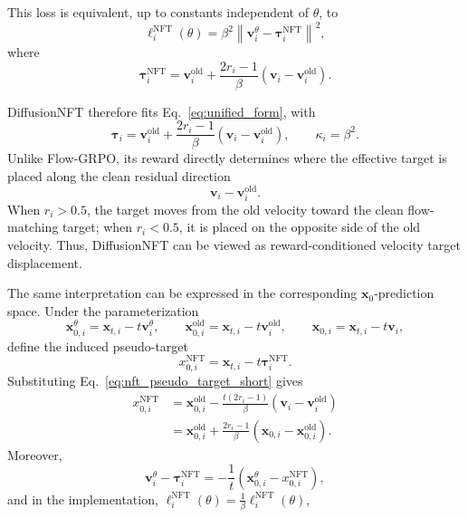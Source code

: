 \documentclass{article} %
\begin{document}
This loss is equivalent, up to constants independent of $\theta$, to
\begin{equation}
\label{eq:nft_velocity_target_short}
\ell_i^{\mathrm{NFT}}(\theta)
=
\beta^2
\left\|
\mathbf{v}_i^\theta
-
\mathbf{\tau}_i^{\mathrm{NFT}}
\right\|^2,
\end{equation}
where
\begin{equation}
\label{eq:nft_pseudo_target_short}
\mathbf{\tau}_i^{\mathrm{NFT}}
=
\mathbf{v}_i^{\mathrm{old}}
+
\frac{2r_i-1}{\beta}
\left(
\mathbf{v}_i-\mathbf{v}_i^{\mathrm{old}}
\right).
\end{equation}

DiffusionNFT therefore fits Eq.~\ref{eq:unified_form}, with
\begin{equation}
\mathbf{\tau}_i
=
\mathbf{v}_i^{\mathrm{old}}
+
\frac{2r_i-1}{\beta}
\left(
\mathbf{v}_i-\mathbf{v}_i^{\mathrm{old}}
\right),
\qquad
\kappa_i
=
\beta^2 .
\end{equation}
Unlike Flow-GRPO, its reward directly determines where the effective target is placed along
the clean residual direction
\[
\mathbf{v}_i-\mathbf{v}_i^{\mathrm{old}}.
\]
When $r_i>0.5$, the target moves from the old velocity toward the clean
flow-matching target; when $r_i<0.5$, it is placed on the opposite side of the
old velocity. Thus, DiffusionNFT can be viewed as reward-conditioned velocity
target displacement.

The same interpretation can be expressed in the corresponding
$\mathbf{x}_0$-prediction space. Under the parameterization
\begin{equation}
\mathbf{x}_{0,i}^{\theta}
=
\mathbf{x}_{t,i}
-
t\mathbf{v}_i^\theta,
\qquad
\mathbf{x}_{0,i}^{\mathrm{old}}
=
\mathbf{x}_{t,i}
-
t\mathbf{v}_i^{\mathrm{old}},
\qquad
\mathbf{x}_{0,i}
=
\mathbf{x}_{t,i}
-
t\mathbf{v}_i,
\end{equation}
define the induced pseudo-target
\begin{equation}
x_{0,i}^{\mathrm{NFT}}
=
\mathbf{x}_{t,i}
-
t\mathbf{\tau}_i^{\mathrm{NFT}}.
\end{equation}
Substituting Eq.~\ref{eq:nft_pseudo_target_short} gives
\begin{align}
x_{0,i}^{\mathrm{NFT}}
&=
\mathbf{x}_{0,i}^{\mathrm{old}}
-
\frac{t(2r_i-1)}{\beta}
\left(
\mathbf{v}_i-\mathbf{v}_i^{\mathrm{old}}
\right)
\\
&=
\mathbf{x}_{0,i}^{\mathrm{old}}
+
\frac{2r_i-1}{\beta}
\left(
\mathbf{x}_{0,i}-\mathbf{x}_{0,i}^{\mathrm{old}}
\right).
\end{align}
Moreover,
\begin{equation}
\mathbf{v}_i^\theta-\mathbf{\tau}_i^{\mathrm{NFT}}
=
-\frac{1}{t}
\left(
\mathbf{x}_{0,i}^\theta
-
x_{0,i}^{\mathrm{NFT}}
\right),
\end{equation}
and in the implementation, $\ell_i^{\mathrm{NFT}}(\theta) = \frac{1}{\beta} \ell_i^{\mathrm{NFT}}(\theta)$,
\end{document}
